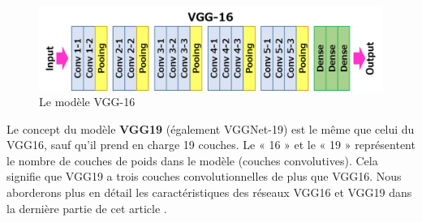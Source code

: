 	
	\begin{figure}[H]%
		\centering
		\includegraphics[width=\textwidth]{images/vgg16.png}
		\caption{Le modèle VGG-16 \cite{tammina2019transfer}}
		\label{fig:VGG16_model}
	\end{figure}

	Le concept du modèle \textbf{VGG19} (également VGGNet-19) est le même que celui du VGG16, sauf qu'il prend en charge 19 couches. Le « 16 » et le « 19 » représentent le nombre de couches de poids dans le modèle (couches convolutives). Cela signifie que VGG19 a trois couches convolutionnelles de plus que VGG16. Nous aborderons plus en détail les caractéristiques des réseaux VGG16 et VGG19 dans la dernière partie de cet article \cite{yu2016visualizing}.


	
	
	
	
	


